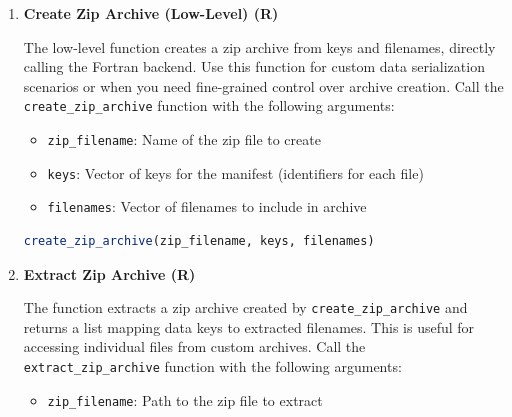 \begin{enumerate}
\begin{enumerate}
\begin{itemize}
                    \item Preserves array attributes and dimensions during serialization
                          
                    \item Character arrays maintain content but may have padding removed
                          upon deserialization
                  \end{itemize}
          \end{enumerate}
    
    \item \textbf{Create Zip Archive (Low-Level) (R)}

The low-level function creates a zip archive from keys and filenames,
directly calling the Fortran backend. Use this function for custom data serialization
scenarios or when you need fine-grained control over archive creation.
Call the \texttt{create\_zip\_archive} function with the following arguments:

    \begin{itemize}
    \item \texttt{zip\_filename}: Name of the zip file to create
          
    \item \texttt{keys}: Vector of keys for the manifest (identifiers for
          each file)
          
    \item \texttt{filenames}: Vector of filenames to include in archive
    \end{itemize}

\begin{lstlisting}[language=R, caption={R Create Zip Archive (Low-Level)}]
create_zip_archive(zip_filename, keys, filenames)
\end{lstlisting}

\item \textbf{Extract Zip Archive (R)}

The function extracts a zip archive created by \texttt{create\_zip\_archive}
and returns a list mapping data keys to extracted filenames. This is useful
for accessing individual files from custom archives. Call the \texttt{extract\_zip\_archive}
function with the following arguments:

\begin{itemize}
    \item \texttt{zip\_filename}: Path to the zip file to extract
\end{itemize}


\end{enumerate}
